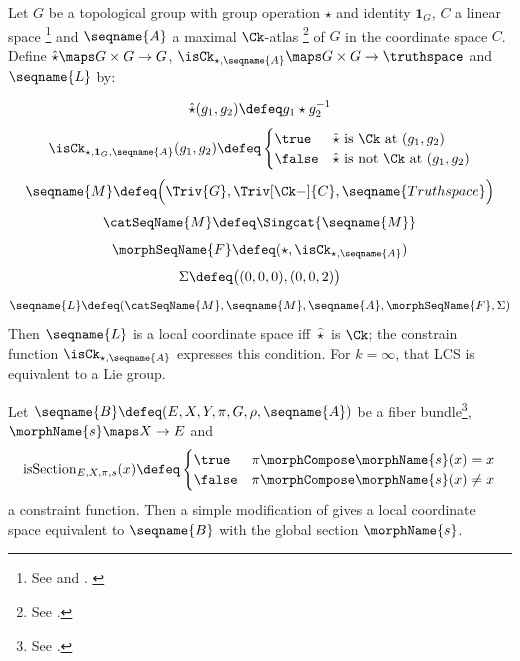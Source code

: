 \documentclass{article}
\begin{document}
\begin{example}
Let $G$ be a topological group with group operation $\star$ and identity
$\mathbf{1}_G$, $C$ a linear space%
\footnote{
  See  and
  {
    \showlabelsinline
    .
  }
}
and $\seqname{A}$ a maximal $\Ck$-atlas%
\footnote{See .}
of $G$ in the coordinate space $C$. Define
$\hat{\star} \maps G \times G \to G$,
$\isCk_{\star,\seqname{A}} \maps G \times G \to \truthspace$ and
$\seqname{L}$ by:

\begin{equation}
 \hat{\star}(g_1,g_2)  \defeq  g_1 \star g_2^{-1}
\end{equation}
\begin{equation}
  \isCk_{\star,\mathbf{1}_G,\seqname{A}}(g_1,g_2) \defeq
  \begin{cases}
    \true  & \text{$\hat{\star}$ is $\Ck$ at $(g_1,g_2)$} \\*
    \false & \text{$\hat{\star}$ is not $\Ck$ at $(g_1,g_2)$}
  \end{cases}
\end{equation}
\begin{equation}
  \seqname{M} \defeq \Bigl ( \Triv{G}, \Triv[\Ck-]{C}, \seqname{Truthspace} \Bigr )
\end{equation}
\begin{equation}
  \catSeqName{M} \defeq \Singcat{\seqname{M}}
\end{equation}
\begin{equation}
  \morphSeqName{F} \defeq (\star, \isCk_{\star,\seqname{A}})
\end{equation}
\begin{equation}
  \Sigma \defeq
  \bigl (
    (0,0,0),
    (0,0,2)
  \bigr )
\end{equation}
\begin{equation}
  \seqname{L} \defeq
  (
    \catSeqName{M},
    \seqname{M},
    \seqname{A},
    \morphSeqName{F},
    \Sigma
  )
\end{equation}
Then $\seqname{L}$
is a local coordinate space iff $\hat{\star}$ is $\Ck$; the constrain
function $\isCk_{\star,\seqname{A}}$ expresses this condition.
For $k = \infty$, that LCS is equivalent to a Lie group.
\end{example}

\begin{example}
Let $\seqname{B} \defeq (E, X, Y, \pi, G, \rho, \seqname{A})$ be a fiber
bundle\footnote{See .},
$\morphName{s} \maps X \to E$ and
\begin{equation}
  \mathrm{isSection}_{E,X,\pi,s} (x) \defeq
  \begin{cases}
    \true  & \pi \morphCompose \morphName{s} (x) = x \\*
    \false & \pi \morphCompose \morphName{s} (x) \ne x
  \end{cases}
\end{equation}
a constraint function. Then a simple modification of
 gives a local coordinate space equivalent to
$\seqname{B}$ with the global section $\morphName{s}$.
\end{example}
\end{document}
